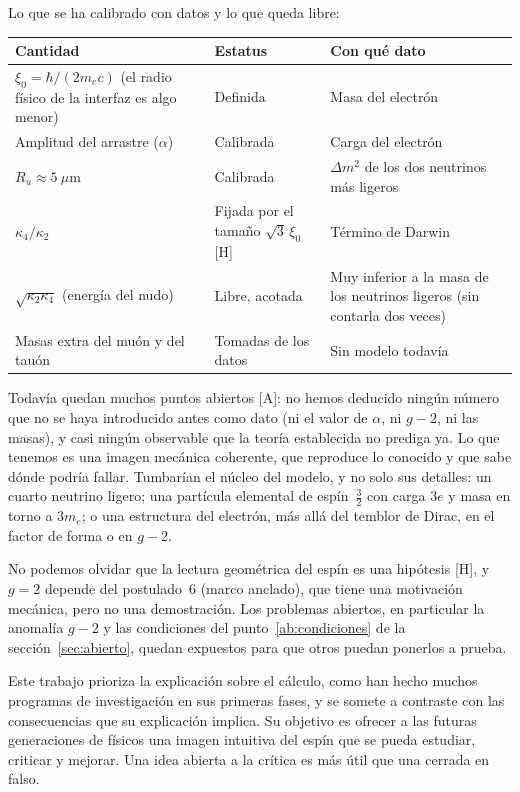 \documentclass[11pt,a4paper]{article}
\newcommand{\st}[1]{\textup{[#1]}}
\begin{document}
Lo que se ha calibrado con datos y lo que queda libre:

\begin{center}
\small
\begin{tabularx}{\textwidth}{@{}>{\raggedright\arraybackslash}p{} Y Y@{}}
\toprule
Cantidad & Estatus & Con qué dato \\
\midrule
$\xi_0=\hbar/(2m_ec)$ (el radio físico de la interfaz es algo menor) & Definida & Masa del electrón \\
Amplitud del arrastre ($\alpha$) & Calibrada & Carga del electrón \\
$R_u\approx5~\mu$m & Calibrada & $\Delta m^2$ de los dos neutrinos más ligeros \\
$\kappa_4/\kappa_2$ & Fijada por el tamaño $\sqrt3\,\xi_0$ \st{H} & Término de Darwin \\
$\sqrt{\kappa_2\kappa_4}$ (energía del nudo) & Libre, acotada & Muy inferior a la masa de los neutrinos ligeros (sin contarla dos veces) \\
Masas extra del muón y del tauón & Tomadas de los datos & Sin modelo todavía \\
\bottomrule
\end{tabularx}
\end{center}

Todavía quedan muchos puntos abiertos \st{A}: no hemos deducido ningún número que no se haya introducido antes como dato (ni el valor de $\alpha$, ni $g-2$, ni las masas), y casi ningún observable que la teoría establecida no prediga ya. Lo que tenemos es una imagen mecánica coherente, que reproduce lo conocido y que sabe dónde podría fallar. Tumbarían el núcleo del modelo, y no solo sus detalles: un cuarto neutrino ligero; una partícula elemental de espín~$\tfrac32$ con carga $3e$ y masa en torno a $3m_e$; o una estructura del electrón, más allá del temblor de Dirac, en el factor de forma o en $g-2$.

No podemos olvidar que la lectura geométrica del espín es una hipótesis \st{H}, y $g=2$ depende del postulado~6 (marco anclado), que tiene una motivación mecánica, pero no una demostración. Los problemas abiertos, en particular la anomalía $g-2$ y las condiciones del punto~\ref{ab:condiciones} de la sección~\ref{sec:abierto}, quedan expuestos para que otros puedan ponerlos a prueba.

Este trabajo prioriza la explicación sobre el cálculo, como han hecho muchos programas de investigación en sus primeras fases, y se somete a contraste con las consecuencias que su explicación implica. Su objetivo es ofrecer a las futuras generaciones de físicos una imagen intuitiva del espín que se pueda estudiar, criticar y mejorar. Una idea abierta a la crítica es más útil que una cerrada en falso.
\end{document}

